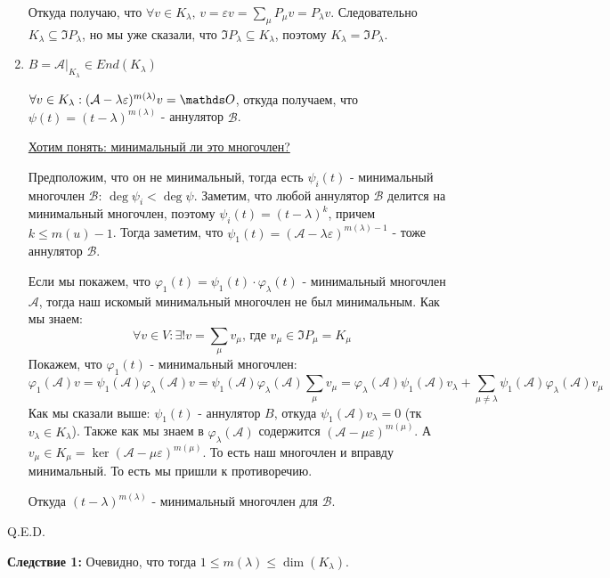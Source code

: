 \begin{enumerate}
    Откуда получаю, что $\forall v \in K_{\lambda}, \, v= \varepsilon v = \sum\limits_{\mu}P_{\mu}v=P_{\lambda}v$. Следовательно $ K_{\lambda }\subseteq \Im P_{\lambda}$, но мы уже сказали, что  $ \Im P_{\lambda} \subseteq K_{\lambda}$, поэтому $ K_{\lambda }= \Im P_{\lambda}$.
    

    \item $B = \mathcal{A}\Big|_{K_{\lambda}}\in End(K_{\lambda})$
    
    $\forall v \in K_{\lambda}:(\mathcal{A}-\lambda \varepsilon)^{m(\lambda)}v = \zero$, откуда получаем, что $\psi(t) = (t-\lambda)^{m(\lambda)}$ - аннулятор $\mathcal{B}$. 

    \uline{Хотим понять: минимальный ли это многочлен?} 
    
    Предположим, что он не минимальный, тогда есть $\psi_i(t)$ - минимальный многочлен $\mathcal{B}$: $\deg \psi_i <\deg \psi$. Заметим, что любой аннулятор $\mathcal{B}$ делится на минимальный многочлен, поэтому $\psi_i(t) =(t-\lambda )^{k}$, причем $k \leq m(u)-1$. Тогда заметим, что $\psi_1(t) = (\mathcal{A}-\lambda \varepsilon)^{m(\lambda)-1}$ - тоже аннулятор $\mathcal{B}$. 

    Если мы покажем, что $\varphi_1(t)=\psi_1(t)\cdot \varphi_{\lambda}(t)$ - минимальный многочлен $\mathcal{A}$, тогда наш искомый минимальный многочлен не был минимальным. Как мы знаем:
    $$\forall v \in V: \exists! v =\sum\limits_{\mu} v_{\mu}\text{, где }v_{\mu}\in \Im P_\mu =  K_\mu$$
    Покажем, что $\varphi_1(t)$ - минимальный многочлен:
$$\varphi_1(\mathcal{A})v=\psi_1(\mathcal{A}) \varphi_{\lambda}(\mathcal{A})v = \psi_1(\mathcal{A}) \varphi_{\lambda}(\mathcal{A})\sum\limits_{\mu} v_{\mu} = \varphi_{\lambda}(\mathcal{A})\psi_1(\mathcal{A})v_\lambda + \sum\limits_{\mu\neq \lambda}\psi_1(\mathcal{A}) \varphi_{\lambda}(\mathcal{A}) v_{\mu}$$
Как мы сказали выше: $\psi_1(t)$ - аннулятор $B$, откуда $\psi_1(\mathcal{A})v_{\lambda} = 0$ (тк $v_\lambda \in K_\lambda$). Также как мы знаем в $\varphi_\lambda(\mathcal{A})$ содержится $(\mathcal{A}-\mu\varepsilon)^{m(\mu)}$. А $v_{\mu} \in K_{\mu} = \ker (\mathcal{A}-\mu\varepsilon)^{m(\mu)}$. То есть наш многочлен и вправду минимальный. То есть мы пришли к противоречию. 

Откуда $(t-\lambda)^{m(\lambda)}$ - минимальный многочлен для $\mathcal{B}$.
    
\end{enumerate}
 \hfill Q.E.D.

 
\textbf{Следствие 1:} Очевидно, что тогда $1 \leq m(\lambda) \leq \dim (K_{\lambda}) $.

